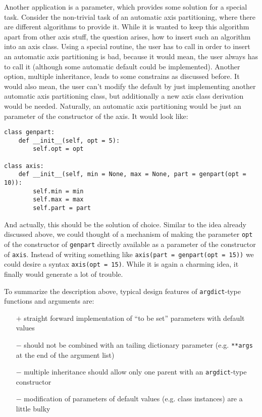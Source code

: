 \documentclass{article}
\begin{document}
Another application is a parameter, which provides some solution for a
special task. Consider the non-trivial task of an automatic axis
partitioning, where there are different algorithms to provide it.
While it is wanted to keep this algorithm apart from other axis stuff,
the question arises, how to insert such an algorithm into an axis
class. Using a special routine, the user has to call in order to
insert an automatic axis partitioning is bad, because it would mean, the
user always has to call it (although some automatic default could be
implemented). Another option, multiple inheritance, leads to some
constrains as discussed before. It would also mean, the user can't
modify the default by just implementing another automatic axis
partitioning class, but additionally a new axis class derivation would
be needed. Naturally, an automatic axis partitioning would be just an
parameter of the constructor of the axis. It would look like:
\begin{verbatim}
class genpart:
    def __init__(self, opt = 5):
        self.opt = opt

class axis:
    def __init__(self, min = None, max = None, part = genpart(opt = 10)):
        self.min = min
        self.max = max
        self.part = part
\end{verbatim}

And actually, this should be the solution of choice. Similar to the
idea already discussed above, we could thought of a mechanism of
making the parameter \verb|opt| of the constructor of \verb|genpart|
directly available as a parameter of the constructor of \verb|axis|.
Instead of writing something like \verb|axis(part = genpart(opt = 15))| 
we could desire a syntax \verb|axis(opt = 15)|. While it is
again a charming idea, it finally would generate a lot of trouble.

To summarize the description above, typical design features of
\verb|argdict|-type functions and arguments are:
\begin{itemize}
\item[$+$]straight forward implementation of ``to be set'' parameters
with default values
\item[$-$]should not be combined with an tailing dictionary parameter
(e.g. \verb|**args| at the end of the argument list)
\item[$-$]multiple inheritance should allow only one parent with an
\verb|argdict|-type constructor
\item[$-$]modification of parameters of default values (e.g. class
instances) are a little bulky
\end{itemize}
\end{document}
